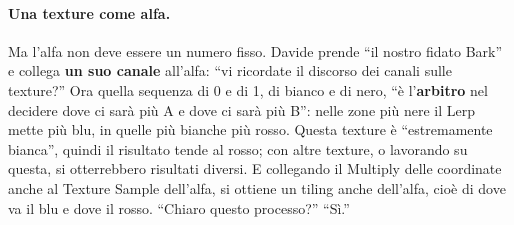 \paragraph{Una texture come alfa.} Ma l'alfa non deve essere un numero fisso. Davide
prende ``il nostro fidato Bark'' e collega \textbf{un suo canale} all'alfa: ``vi ricordate
il discorso dei canali sulle texture?'' Ora quella sequenza di 0 e di 1, di bianco e di
nero, ``è l'\textbf{arbitro} nel decidere dove ci sarà più A e dove ci sarà più B'':
nelle zone più nere il Lerp mette più blu, in quelle più bianche più rosso. Questa
texture è ``estremamente bianca'', quindi il risultato tende al rosso; con altre
texture, o lavorando su questa, si otterrebbero risultati diversi. E collegando il
Multiply delle coordinate anche al Texture Sample dell'alfa, si ottiene un tiling
anche dell'alfa, cioè di dove va il blu e dove il rosso. ``Chiaro questo processo?''
``Sì.''

